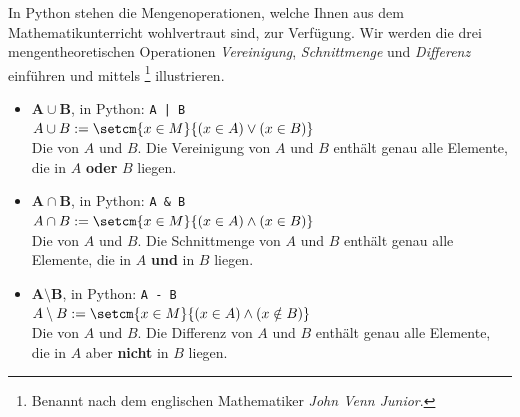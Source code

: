 In Python stehen die Mengenoperationen, welche Ihnen aus dem Mathematikunterricht wohlvertraut sind, zur Verfügung. Wir werden die drei mengentheoretischen Operationen \textit{Vereinigung}, \textit{Schnittmenge} und \textit{Differenz} einführen und mittels \footnote{Benannt nach dem englischen Mathematiker \textit{John Venn Junior}.} illustrieren.

\begin{itemize}
	\item $\mathbf{A \cup B}$, in Python: \lstinline/A | B/\\
	      $A \cup B := \setcm{x\in M}{(x\in A) \lor (x\in B)}$\\
	      Die  von $A$ und $B$. Die Vereinigung von $A$ und $B$ enthält genau alle Elemente, die in $A$ \textbf{oder} $B$ liegen.
	      \begin{center}
	      \end{center}
	\item $\mathbf{A \cap B}$, in Python: \lstinline|A & B|\\
	      $A \cap B := \setcm{x\in M}{(x\in A) \land (x\in B)}$\\
	      Die  von $A$ und $B$. Die Schnittmenge von $A$ und $B$ enthält genau alle Elemente, die in $A$ \textbf{und} in $B$ liegen.
	      \begin{center}
	      \end{center}
	\item $\mathbf{A\setminus B}$, in Python: \lstinline|A - B|\\
	      $A\setminus B := \setcm{x\in M}{(x\in A) \land (x\notin B)}$\\
	      Die  von $A$ und $B$. Die Differenz von $A$ und $B$ enthält genau alle Elemente, die in $A$ aber \textbf{nicht} in $B$ liegen.

\end{itemize}
